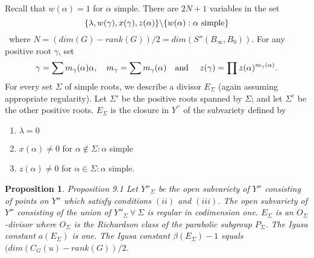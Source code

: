 \documentclass{memo-l}
\newtheorem{proposition}[theorem]{Proposition}
\theoremstyle{definition}
\theoremstyle{remark}
\numberwithin{section}{chapter}
\numberwithin{equation}{chapter}
\begin{document}
   Recall that $w({\alpha})=1$ for ${\alpha}$ simple. 
 There are $2N+1$ variables in the set 
 $$
 \{{\lambda},w({\gamma}),x({\gamma}),
z(\alpha)\}\backslash \{w(\alpha) : {\alpha} \hbox{ simple}\}
$$
\ where  $N = 
(dim(G)-rank(G))/2 = dim(S''(B_{{\infty}},B_{0}))$. 
 For any positive root ${\gamma}$, set 
 $${\gamma}=\sum m_{{\gamma}}
({\alpha}){\alpha}, \quad m_{{\gamma}}=\sum m_{{\gamma}}({\alpha}) 
\quad\hbox{and }\quad 
z({\gamma}) = \prod z({\alpha})^{m_\gamma(\alpha)}.$$
For every set
${\Sigma}$ of simple roots, we describe a divisor $E_{{\Sigma}}$ (again 
assuming appropriate regularity). 
 Let ${\Sigma}'$ be the positive roots spanned by ${\Sigma}$; and let 
${\Sigma}^{c}$ be the other positive roots. 
 $E_{{\Sigma}}$ is the closure in $Y^{\prime\prime}$ of the subvariety defined by

\begin{enumerate}[label=\roman*)]
\item ${\lambda}=0$   
\item $x({\alpha})\ne 0$ for ${\alpha} \notin  {\Sigma} : {\alpha}$ 
simple
\item $z({\alpha})\ne 0$ for ${\alpha} \in {\Sigma} : {\alpha}$ simple.
\end{enumerate}



\begin{proposition}{Proposition 9.1}   Let $Y''_{{\Sigma}}$ be the open subvariety of $Y''$ 
consisting of points on $Y''$ which satisfy conditions $(ii)$ and $(iii)$. 
 The open subvariety of $Y''$ consisting of the union of $Y''_{{\Sigma}} {\
\forall\ } {\Sigma}$ is regular in codimension one. 
 $E_{{\Sigma}}$ is an $O_{{\Sigma}}$-divisor where $O_{{\Sigma}}$ is the 
Richardson class of the parabolic subgroup $P_{{\Sigma}}$. 
 The Igusa constant $a(E_{{\Sigma}})$ is one. 
 The Igusa constant ${\beta}(E_{{\Sigma}})-1$ equals $(dim(C_{G}(u)-rank(G))/2$.
\end{proposition}
\end{document}

